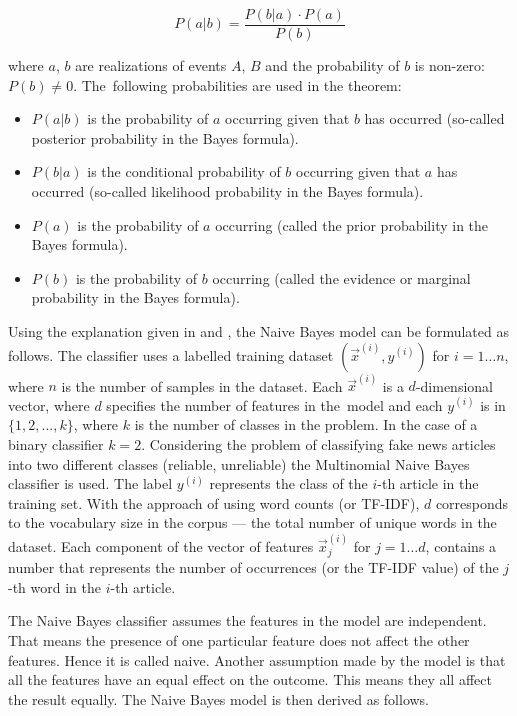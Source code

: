 \begin{equation}    
    P(a | b) = \displaystyle{\frac{P(b|a) \cdot P(a)}{P(b)}}
\end{equation}

where $a$, $b$ are realizations of events $A$, $B$ and the probability of $b$ is non-zero: $P(b) \neq 0$. The~following probabilities are used in the theorem:

\begin{itemize}
    \item $P(a | b)$ is the probability of $a$ occurring given that $b$ has occurred (so-called posterior probability in the Bayes formula).
    \item $P(b | a)$ is the conditional probability of $b$ occurring given that $a$ has occurred (so-called likelihood probability in the Bayes formula). 
    \item $P(a)$ is the probability of $a$ occurring (called the prior probability in the Bayes formula).
    \item $P(b)$ is the probability of $b$ occurring (called the evidence or marginal probability in the Bayes formula).
\end{itemize}

Using the explanation given in \cite{colins-mnb} and \cite{naive-bayes-towards}, the Naive Bayes model can be formulated as follows. The classifier uses a labelled training dataset $(\Vec{x}^{(i)}, y^{(i)})$ for $i = 1…n$, where $n$ is the number of samples in the dataset. Each $\Vec{x}^{(i)}$ is a $d$-dimensional vector, where $d$ specifies the number of features in the~model and each $y^{(i)}$ is in $\{1,2,...,k\}$, where $k$ is the number of classes in the problem. In the case of a binary classifier $k = 2$. 
Considering the problem of classifying fake news articles into two different classes (reliable, unreliable) the Multinomial Naive Bayes classifier is used. The label $y^{(i)}$ represents the class of the $i$-th article in the training set. With the approach of using word counts (or TF-IDF), $d$ corresponds to the vocabulary size in the corpus --- the total number of unique words in the dataset. Each component of the vector of features $\Vec{x}^{(i)}_j$ for $j = 1…d$, contains a number that represents the number of occurrences (or the TF-IDF value) of the $j$-th word in the $i$-th article. 

The Naive Bayes classifier assumes the features in the model are independent. That means the presence of one particular feature does not affect the other features. Hence it is called naive. Another assumption made by the model is that all the features have an equal effect on the outcome. This means they all affect the result equally. The Naive Bayes model is then derived as follows. 

